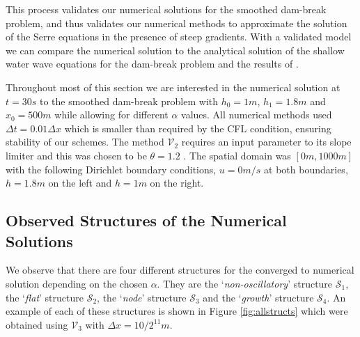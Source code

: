 \documentclass[times]{elsarticle}
\begin{document}
This process validates our numerical solutions for the smoothed dam-break problem, and thus validates our numerical methods to approximate the solution of the Serre equations in the presence of steep gradients. With a validated model we can compare the numerical solution to the analytical solution of the shallow water wave equations for the dam-break problem and the results of \citet{El-etal-2006}.

Throughout most of this section we are interested in the numerical solution at $t=30s$ to the smoothed dam-break problem with $h_0 = 1m$, $h_1 = 1.8m$ and $x_0 = 500m$ while allowing for different $\alpha$ values. All numerical methods used $\Delta t = 0.01 \Delta x$ which is smaller than required by the CFL condition, ensuring stability of our schemes. The method $\mathcal{V}_2$ requires an input parameter to its slope limiter and this was chosen to be $\theta = 1.2$ \cite{Zoppou-etal-2017}. The spatial domain was $[0m,1000m]$ with the following Dirichlet boundary conditions, $u = 0m/s$ at both boundaries, $h =1.8m$ on the left and $h =1m$ on the right.

\subsection{Observed Structures of the Numerical Solutions}
\label{subsec:observedstructs}
We observe that there are four different structures for the converged to numerical solution depending on the chosen $\alpha$. They are the `\textit{non-oscillatory}' structure $\mathcal{S}_1$, the `\textit{flat}' structure $\mathcal{S}_2$, the `\textit{node}' structure $\mathcal{S}_3$ and the `\textit{growth}' structure $\mathcal{S}_4$. An example of each of these structures is shown in Figure \ref{fig:allstructs} which were obtained using $\mathcal{V}_3$ with $\Delta x = 10/2^{11}m$.
\end{document}
